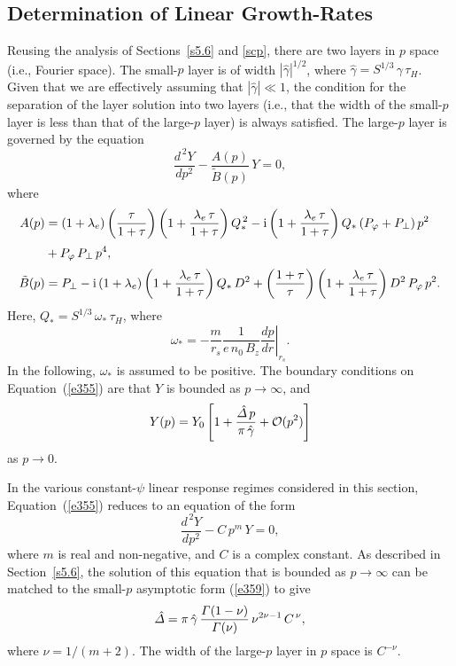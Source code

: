 \documentclass[notitlepage,12pt]{article}
\begin{document}
\subsection{Determination of Linear Growth-Rates}\label{s6.3}
Reusing the analysis of Sections~\ref{s5.6} and \ref{scp}, there are two layers in $p$ space (i.e., Fourier space). The
small-$p$ layer is of width $|\hat{\gamma}|^{1/2}$, where $\hat{\gamma} = S^{1/3}\,\gamma\,\tau_H$. Given that we are effectively assuming that
$|\hat{\gamma}|\ll 1$, the condition for the separation of the layer solution into two layers (i.e., that the width of the small-$p$ layer is less than that of the large-$p$ layer) is always satisfied. The large-$p$ layer is governed by the equation
\begin{equation}\label{e355}
\frac{d^{\,2} Y}{dp^2} - \frac{A(p)}{\tilde{B}(p)} \,Y =0,
\end{equation}
where 
\begin{align}
A(p) &= (1+\lambda_e)\left(\frac{\tau}{1+\tau}\right)\left(1+ \frac{\lambda_e\,\tau}{1+\tau}\right)Q_\ast^{\,2}
-{\rm i}\left(1+\frac{\lambda_e\,\tau}{1+\tau}\right)Q_\ast\,(P_\varphi+P_\perp)\,p^2\nonumber\\[0.5ex]
\phantom{=} &+ P_\varphi\,P_\perp\,p^4,\\[0.5ex]
\tilde{B}(p)&= P_\perp - {\rm i}\,(1+\lambda_e)\left(1+\frac{\lambda_e\,\tau}{1+\tau}\right)Q_\ast\,D^2 +\left(\frac{1+\tau}{\tau}\right)\left(1+\frac{\lambda_e\,\tau}{1+\tau}\right) D^2\,P_\varphi\,p^2.
\end{align}
Here, $Q_\ast = S^{1/3}\,\omega_\ast\,\tau_H$, where
\begin{equation}
\omega_\ast = -\frac{m}{r_s}\frac{1}{e\,n_0\,B_z}\left.\frac{dp}{dr}\right|_{r_s}.
\end{equation}
In the following, $\omega_\ast$ is assumed to be positive. The boundary conditions on Equation~(\ref{e355}) are
that $Y$ is bounded as $p\rightarrow\infty$, and
\begin{equation}\label{e359}
Y(p)= Y_0\left[1+\frac{\hat{\mit\Delta}\,p}{\pi\,\hat{\gamma}} + {\cal O}(p^2)\right]
\end{equation}
as $p\rightarrow 0$. 

In the various constant-$\psi$ linear response regimes considered in this section, Equation~(\ref{e355}) reduces to an equation of the form
\begin{equation}
\frac{d^{\,2} Y}{dp^2} - C\,p^m\,Y = 0,
\end{equation}
where $m$ is real and non-negative, and $C$ is a complex constant. As described in Section~\ref{s5.6}, the solution of this
equation that is bounded as $p\rightarrow \infty$ can be matched to the small-$p$ asymptotic form (\ref{e359}) to give 
\begin{equation}
\hat{\mit\Delta} = \pi\,\hat{\gamma}\,\frac{{\mit\Gamma}(1-\nu)}{{\mit\Gamma}(\nu)}\,\nu^{2\nu-1}\,C^{\,\nu},
\end{equation}
where $\nu=1/(m+2)$. The width of the large-$p$ layer in $p$ space is $C^{-\nu}$. 
\end{document}
